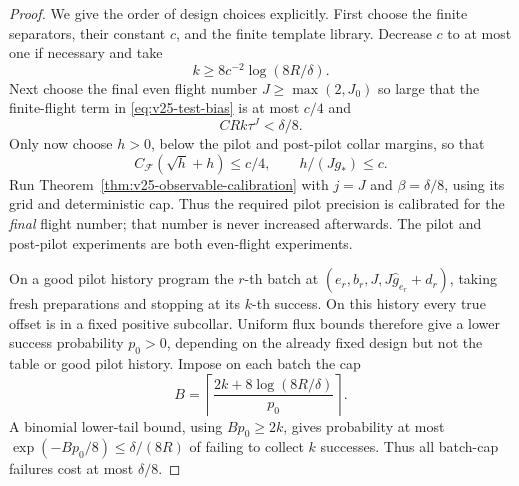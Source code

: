 \begin{proof}
We give the order of design choices explicitly.  First choose the finite
separators, their constant \(c\), and the finite template library.  Decrease
\(c\) to at most one if necessary and take
\begin{equation}\label{eq:v25-k-choice}
                k\ge 8c^{-2}\log(8R/\delta).
\end{equation}
Next choose the final even flight number \(J\ge\max(2,J_0)\) so large
that the finite-flight term in \eqref{eq:v25-test-bias} is at most \(c/4\)
and
\begin{equation}\label{eq:v25-full-transfer-budget}
                            C R k\tau^J<\delta/8.
\end{equation}
Only now choose \(h>0\), below the pilot and post-pilot collar margins,
so that
\begin{equation}\label{eq:v25-h-choice}
 C_{\mathscr F}(\sqrt h+h)\le c/4,\qquad h/(Jg_*)\le c.
\end{equation}
Run Theorem~\ref{thm:v25-observable-calibration} with \(j=J\) and
\(\beta=\delta/8\), using its grid and deterministic cap.  Thus the
required pilot precision is calibrated for the \emph{final} flight number;
that number is never increased afterwards.  The pilot and post-pilot
experiments are both even-flight experiments.

On a good pilot history program the \(r\)-th batch at
\((e_r,b_r,J,J\widehat g_{e_r}+d_r)\), taking fresh preparations and
stopping at its \(k\)-th success.  On this history every true offset is in
a fixed positive subcollar.  Uniform flux bounds therefore give a lower
success probability \(p_0>0\), depending on the already fixed design but
not the table or good pilot history.  Impose on each batch the cap
\begin{equation}\label{eq:v25-post-cap}
 B=\left\lceil\frac{2k+8\log(8R/\delta)}{p_0}\right\rceil.
\end{equation}
A binomial lower-tail bound, using \(Bp_0\ge2k\), gives probability at
most \(\exp(-Bp_0/8)\le\delta/(8R)\) of failing to collect \(k\)
successes.  Thus all batch-cap failures cost at most \(\delta/8\).


\end{proof}
